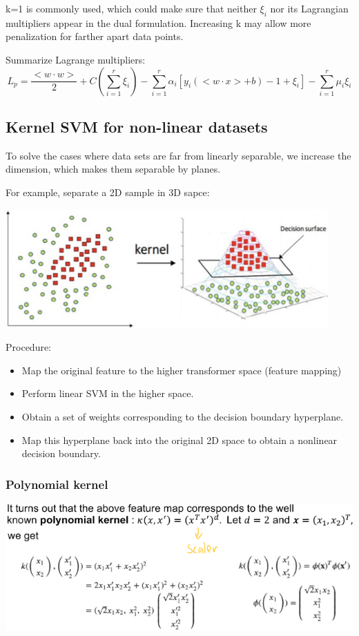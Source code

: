 \documentclass[letterpaper,12pt]{article}
\begin{document}
k=1 is commonly used, which could make sure that neither $\xi_i$ nor its Lagrangian multipliers appear in the dual formulation. Increasing k may allow more penalization for farther apart data points.

Summarize Lagrange multipliers:
\[
L_p=\frac{<w\cdot w>}{2}+C    (\sum_{i=1}^{r}\xi_i)-\sum_{i=1}^{r}\alpha_i[y_i(<w\cdot x>+b)-1+\xi_i]-\sum_{i=1}^{r}\mu_i \xi_i
\]

\subsection{Kernel SVM for non-linear datasets}
To solve the cases where data sets are far from linearly separable, we increase the dimension, which makes them separable by planes. 

For example, separate a 2D sample in 3D sapce: 

\includegraphics*{./Image/2D to 3D example.png}

Procedure:
\begin{itemize}
    \item Map the original feature to the higher transformer space (feature mapping)
    \item Perform linear SVM in the higher space.
    \item Obtain a set of weights corresponding to the decision boundary hyperplane. 
    \item Map this hyperplane back into the original 2D space to obtain a non\-linear decision boundary.
\end{itemize}

\subsubsection{Polynomial kernel}
\includegraphics*{./Image/Polynomial Kernel.png}
\end{document}
